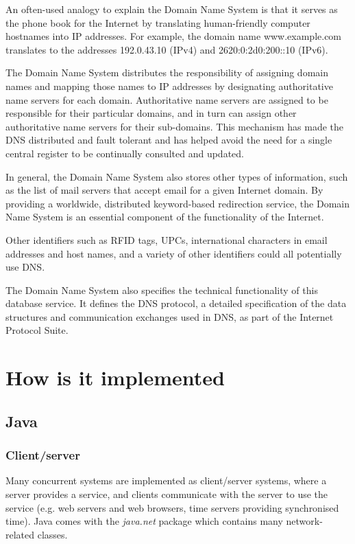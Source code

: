 \documentclass[a4paper,oneside]{report}
\begin{document}
	 An often-used analogy to explain the Domain Name System is that it serves as the phone book for the Internet by translating human-friendly computer hostnames into IP addresses. For example, the domain name www.example.com translates to the addresses 192.0.43.10 (IPv4) and 2620:0:2d0:200::10 (IPv6).
	
	The Domain Name System distributes the responsibility of assigning domain names and mapping those names to IP addresses by designating authoritative name servers for each domain. Authoritative name servers are assigned to be responsible for their particular domains, and in turn can assign other authoritative name servers for their sub-domains. This mechanism has made the DNS distributed and fault tolerant and has helped avoid the need for a single central register to be continually consulted and updated.

	 In general, the Domain Name System also stores other types of information, such as the list of mail servers that accept email for a given Internet domain. By providing a worldwide, distributed keyword-based redirection service, the Domain Name System is an essential component of the functionality of the Internet.

	 Other identifiers such as RFID tags, UPCs, international characters in email addresses and host names, and a variety of other identifiers could all potentially use DNS.

	 The Domain Name System also specifies the technical functionality of this database service. It defines the DNS protocol, a detailed specification of the data structures and communication exchanges used in DNS, as part of the Internet Protocol Suite.

  	\section{How is it implemented}
  	
    	\subsection{Java}
    	
      		\subsubsection{Client/server}
      		Many concurrent systems are implemented as client/server systems, where a server provides a service, and clients communicate with the server to use the service (e.g. web servers and web browsers, time servers providing synchronised time). Java comes with the \emph{java.net} package which contains many network-related classes.
      		
\end{document}

